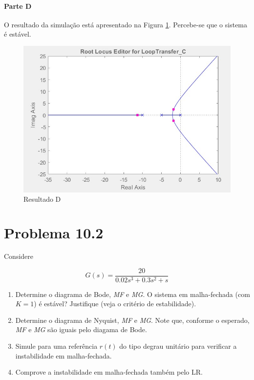 \documentclass[
]{book}
\providecommand{\tightlist}{%
  \setlength{\itemsep}{0pt}\setlength{\parskip}{0pt}}
\theoremstyle{definition}
\theoremstyle{definition}
\theoremstyle{definition}
\theoremstyle{remark}
\begin{document}
\hypertarget{parte-d-4}{%
\paragraph{Parte D}\label{parte-d-4}}

O resultado da simulação está apresentado na Figura \ref{fig:fig10RA4}. Percebe-se que o sistema é estável.

\begin{figure}

{\centering \includegraphics[width=0.5\linewidth]{Imagens/Lab10/Resolução/fig4} 

}

\caption{Resultado D}\label{fig:fig10RA4}
\end{figure}

\hypertarget{problema-10.2}{%
\section*{Problema 10.2}\label{problema-10.2}}

Considere

\[
G(s) = \frac{20}{0.02s^3+0.3s^2+s}
\]

\begin{enumerate}
\def\labelenumi{\alph{enumi}.}
\tightlist
\item
  Determine o diagrama de Bode, \emph{MF} e \emph{MG}. O sistema em malha-fechada (com \(K=1\)) é estável? Justifique (veja o critério de estabilidade).
\item
  Determine o diagrama de Nyquist, \emph{MF} e \emph{MG}. Note que, conforme o esperado, \emph{MF} e \emph{MG} são iguais pelo diagama de Bode.
\item
  Simule para uma referência \(r(t)\) do tipo degrau unitário para verificar a instabilidade em malha-fechada.
\item
  Comprove a instabilidade em malha-fechada também pelo LR.
\end{enumerate}
\end{document}
